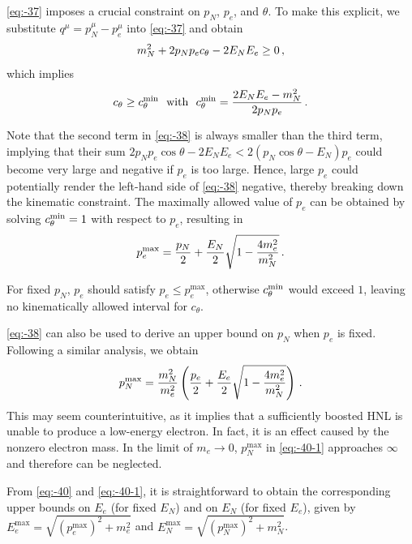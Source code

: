 \documentclass[aps,prd,twocolumn,preprintnumbers,superscriptaddress,nofootinbib]{revtex4-1}
\begin{document}
\cref{eq:-37} imposes a crucial constraint on $p_{N}$, $p_{e}$,
and $\theta$.  To make this explicit, we substitute $q^{\mu}=p_{N}^{\mu}-p_{e}^{\mu}$
into \cref{eq:-37} and obtain
\begin{equation}
m_{N}^{2}+2p_{N}p_{e}c_{\theta}-2E_{N}E_{e}\geq0\thinspace,\label{eq:-38}
\end{equation}
which implies
\begin{equation}
c_{\theta}\geq c_{\theta}^{{\rm \min}}\ \ \text{with}\ \ c_{\theta}^{{\rm \min}}=\frac{2E_{N}E_{e}-m_{N}^{2}}{2p_{N}p_{e}}\thinspace.\label{eq:-39}
\end{equation}

Note that the second term in \cref{eq:-38} is always smaller
than the third term, implying that their sum $2p_{N}p_{e}\cos\theta-2E_{N}E_{e}<2(p_{N}\cos\theta-E_{N})p_{e}$
could become very large and negative if $p_{e}$ is too large. Hence,
large $p_{e}$ could potentially render the left-hand side of \cref{eq:-38}
negative, thereby breaking down the kinematic constraint.    The
maximally allowed value of $p_{e}$ can be obtained by solving $c_{\theta}^{{\rm \min}}=1$
with respect to $p_{e}$, resulting in 
\begin{equation}
p_{e}^{\max}=\frac{p_{N}}{2}+\frac{E_{N}}{2}\sqrt{1-\frac{4m_{e}^{2}}{m_{N}^{2}}}\thinspace.\label{eq:-40}
\end{equation}

For fixed $p_{N}$, $p_{e}$ should satisfy $p_{e}\leq p_{e}^{\max}$, otherwise $c_{\theta}^{{\rm \min}}$ would exceed $1$, leaving
no kinematically allowed interval for $c_{\theta}$. 

\cref{eq:-38} can also be used to derive an upper bound on $p_{N}$
when $p_{e}$ is fixed.  Following a similar analysis, we obtain
\begin{equation}
p_{N}^{\max}=\frac{m_{N}^{2}}{m_{e}^{2}}\left(\frac{p_{e}}{2}+\frac{E_{e}}{2}\sqrt{1-\frac{4m_{e}^{2}}{m_{N}^{2}}}\right)\thinspace.\label{eq:-40-1}
\end{equation}
This may seem counterintuitive, as it implies that a sufficiently
boosted HNL is unable to produce a low-energy electron. In fact, it
is an effect caused by the nonzero electron mass. In the limit of
$m_{e}\to0$, $p_{N}^{\max}$ in \cref{eq:-40-1} approaches
$\infty$ and therefore can be neglected. 

From \cref{eq:-40} and \cref{eq:-40-1}, it is straightforward
to obtain the corresponding upper bounds on $E_{e}$ (for fixed $E_{N}$)
and on $E_{N}$ (for fixed $E_{e}$), given by $E_{e}^{\max}=\sqrt{(p_{e}^{\max})^{2}+m_{e}^{2}}$
and $E_{N}^{\max}=\sqrt{(p_{N}^{\max})^{2}+m_{N}^{2}}$. 
\end{document}
